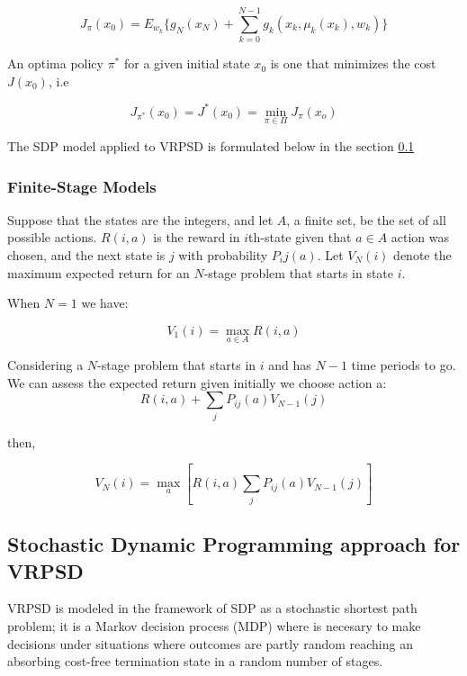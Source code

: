 \begin{equation}\label{eq:SDP_expected_cost_policy}
 J_\pi(x_0) = E_{w_k}\biggr\{g_N(x_N)+\sum_{k=0}^{N-1}g_k(x_k,\mu_k(x_k),w_k)\biggr\}
\end{equation}

An optima policy $\pi^*$ for a given initial state $x_0$ is one that minimizes the cost $J(x_0)$, i.e

\[J_{\pi^*}(x_0)=J^*(x_0)=\min\limits_{\pi\in\Pi}J_\pi(x_o)\]


The SDP model applied to VRPSD is formulated below in the section \ref{sec:SDP_model_VRPSD}


\subsubsection{Finite-Stage Models}%


Suppose that the states are the integers, and let $A$, a finite set, be the set of all possible actions.
$R(i,a)$ is the reward in $i$th-state given that $a \in A$ action was chosen, and the next state is $j$ with probability $P_ij(a)$.
Let $V_N(i)$ denote the maximum expected return for an $N$-stage problem that starts in state $i$.

When $N=1$ we have:

\begin{equation}\label{eq:maxValueN=1}
 V_1(i) =  \max_{a\in A}R(i,a)
\end{equation}

Considering a $N$-stage problem that starts in $i$ and has $N-1$ time periods to go. We can assess the expected return given initially we choose action a:
\[R(i,a)+\sum_jP_{ij}(a)V_{N-1}(j)\]

then,

\begin{equation}
 V_N(i)=\max_a[R(i,a)\sum_jP_{ij}(a)V_{N-1}(j)]
\end{equation}


\subsection{Stochastic Dynamic Programming approach for VRPSD}\label{sec:SDP_model_VRPSD}

VRPSD is modeled in the framework of SDP as a stochastic shortest path problem; it is a Markov decision process (MDP) where is necesary to make decisions under situations where outcomes are partly random reaching an absorbing cost-free termination state in a random number of stages.

